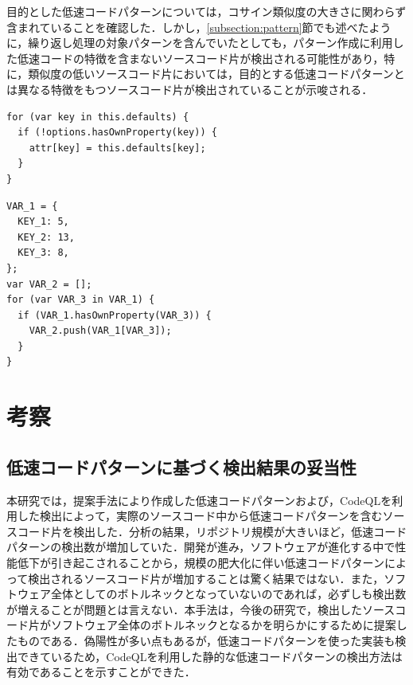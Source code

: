 \documentclass[submit,techrep,noauthor]{ipsj}
\begin{document}
目的とした低速コードパターンについては，コサイン類似度の大きさに関わらず含まれていることを確認した．しかし，\ref{subsection:pattern}節でも述べたように，繰り返し処理の対象パターンを含んでいたとしても，パターン作成に利用した低速コードの特徴を含まないソースコード片が検出される可能性があり，特に，類似度の低いソースコード片においては，目的とする低速コードパターンとは異なる特徴をもつソースコード片が検出されていることが示唆される．


\begin{lstlisting}[caption=リポジトリ中の高類似度検出例, label=ID3_highcos, captionpos=t, columns=flexible]
for (var key in this.defaults) {
  if (!options.hasOwnProperty(key)) {
    attr[key] = this.defaults[key];
  }
}
\end{lstlisting}


\begin{lstlisting}[caption=マイクロベンチマーク中の高類似度検出例, label=MB_highcos, captionpos=t, columns=flexible]
VAR_1 = {
  KEY_1: 5,
  KEY_2: 13,
  KEY_3: 8,
};
var VAR_2 = [];
for (var VAR_3 in VAR_1) {
  if (VAR_1.hasOwnProperty(VAR_3)) {
    VAR_2.push(VAR_1[VAR_3]);
  }
}
\end{lstlisting}


\section{考察}
\label{sec:discussion}


\subsection{低速コードパターンに基づく検出結果の妥当性}

本研究では，提案手法により作成した低速コードパターンおよび，CodeQLを利用した検出によって，実際のソースコード中から低速コードパターンを含むソースコード片を検出した．分析の結果，リポジトリ規模が大きいほど，低速コードパターンの検出数が増加していた．開発が進み，ソフトウェアが進化する中で性能低下が引き起こされる\cite{emprical_perfomancebug}ことから，規模の肥大化に伴い低速コードパターンによって検出されるソースコード片が増加することは驚く結果ではない．また，ソフトウェア全体としてのボトルネックとなっていないのであれば，必ずしも検出数が増えることが問題とは言えない．本手法は，今後の研究で，検出したソースコード片がソフトウェア全体のボトルネックとなるかを明らかにするために提案したものである．偽陽性が多い点もあるが，低速コードパターンを使った実装も検出できているため，CodeQLを利用した静的な低速コードパターンの検出方法は有効であることを示すことができた．
\end{document}
